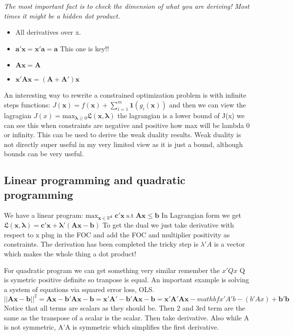 \documentclass{article}
\begin{document}
\textit{The most important fact is to check the dimension of what you are deriving! Most times it might be a hidden dot product.}

\begin{itemize}
    \item All derivatives over x.
    \item $\mathbf{a'x} = \mathbf{x'a} = \mathbf{a} $ This one is key!!
    \item $\mathbf{Ax} = \mathbf{A} $ 
    \item $ \mathbf{x'Ax} = \mathbf{(A + A')x} $
\end{itemize}

An interesting way to rewrite a constrained optimization problem is with infinite steps functions: 
$J(\mathbf{x}) = f(\mathbf{x}) + \sum_{i=1}^{m}\mathbf{1}(g_i(\mathbf{x}))$ and then we can view the lagragian 
$J(x) = \text{max}_{\mathbf{\lambda} \geq 0}\mathfrak{L}(\mathbf{x,\lambda}) $ the lagrangian is a lower bound of J(x) we can see 
this when constraints are negative and positive how max will be lambda 0 or infinity. This can be used to derive the weak 
duality results. Weak duality is not directly super useful in my very limited view as it is just a bound, although bounds can be
very useful. 

\subsection*{Linear programming and quadratic programming}

We have a linear program: $\text{max}_{\mathbf{\mathbf{x} \in \mathbb{R}^d}}\; \mathbf{c'x}\;  \text{s.t}\; \mathbf{Ax} \leq \mathbf{b} $
In Lagrangian form we get $\mathfrak{L}(\mathbf{x,\lambda})  = \mathbf{c'x} +  \mathbf{\lambda' (Ax - b)} $
To get the dual we just take derivative with respect to x plug in the FOC and add the FOC and multiplier positivity as constraints. 
The derivation has been completed the tricky step is $\lambda'A$ is a vector which makes the whole thing a dot product!

For quadratic program we can get something very similar remember the $x'Qx$ Q is symetric positive definite so tranpose is equal. 
An important example is solving a system of equations via squared error loss, OLS. 
$$||\mathbf{Ax -b}||^2 = \mathbf{Ax -b}'\mathbf{Ax -b} = \mathbf{x'A' -b'} \mathbf{Ax -b} = \mathbf{x'A'Ax} - mathbf{x'A'b} - (b'Ax) +\mathbf{b'b}$$
Notice that all terms are scalars as they should be. Then 2 and 3rd term are the same as the transpose of a scalar is the scalar. Then take derivative. 
Also while A is not symmetric, A'A is symmetric which simplifies the first derivative.
\end{document}
